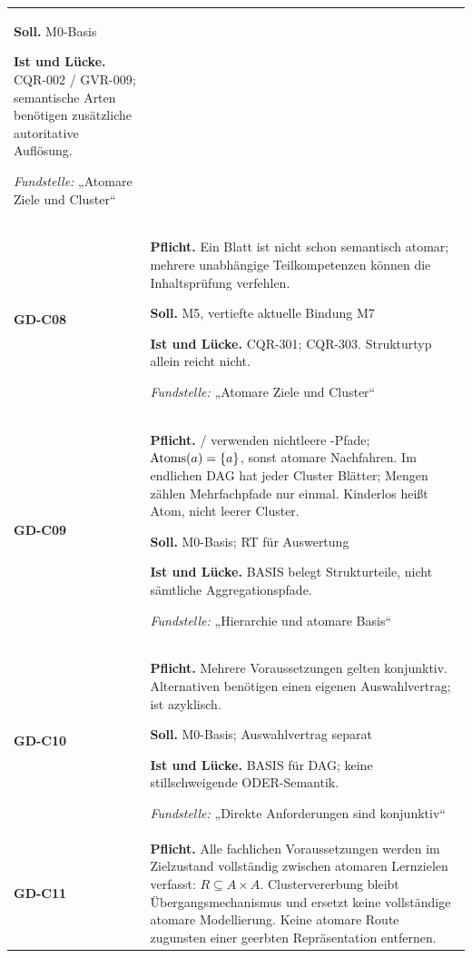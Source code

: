 \begin{longtable}{@{}P{20mm}P{128mm}@{}}
\textbf{Soll.} M0-Basis\par\smallskip
\textbf{Ist und Lücke.} CQR-002 / GVR-009; semantische Arten benötigen zusätzliche autoritative Auflösung.\par\smallskip
\emph{Fundstelle:} „Atomare Ziele und Cluster“\\\addlinespace[5pt]
\label{rule:GD-C08}\textbf{GD-C08} &
\textbf{Pflicht.} Ein Blatt ist nicht schon semantisch atomar; mehrere unabhängige Teilkompetenzen können die Inhaltsprüfung verfehlen.\par\smallskip
\textbf{Soll.} M5, vertiefte aktuelle Bindung M7\par\smallskip
\textbf{Ist und Lücke.} CQR-301; CQR-303. Strukturtyp allein reicht nicht.\par\smallskip
\emph{Fundstelle:} „Atomare Ziele und Cluster“\\\addlinespace[5pt]
\label{rule:GD-C09}\textbf{GD-C09} &
\textbf{Pflicht.} / verwenden nichtleere -Pfade; \(\operatorname{Atoms}(a)=\{a\}\), sonst atomare Nachfahren. Im endlichen DAG hat jeder Cluster Blätter; Mengen zählen Mehrfachpfade nur einmal. Kinderlos heißt Atom, nicht leerer Cluster.\par\smallskip
\textbf{Soll.} M0-Basis; RT für Auswertung\par\smallskip
\textbf{Ist und Lücke.} BASIS belegt Strukturteile, nicht sämtliche Aggregationspfade.\par\smallskip
\emph{Fundstelle:} „Hierarchie und atomare Basis“\\\addlinespace[5pt]
\label{rule:GD-C10}\textbf{GD-C10} &
\textbf{Pflicht.} Mehrere Voraussetzungen gelten konjunktiv. Alternativen benötigen einen eigenen Auswahlvertrag;  ist azyklisch.\par\smallskip
\textbf{Soll.} M0-Basis; Auswahlvertrag separat\par\smallskip
\textbf{Ist und Lücke.} BASIS für DAG; keine stillschweigende ODER-Semantik.\par\smallskip
\emph{Fundstelle:} „Direkte Anforderungen sind konjunktiv“\\\addlinespace[5pt]
\label{rule:GD-C11}\textbf{GD-C11} &
\textbf{Pflicht.} Alle fachlichen Voraussetzungen werden im Zielzustand vollständig zwischen atomaren Lernzielen verfasst: \(R\subseteq A\times A\). Clustervererbung bleibt Übergangsmechanismus und ersetzt keine vollständige atomare Modellierung. Keine atomare Route zugunsten einer geerbten Repräsentation entfernen.\par\smallskip

\end{longtable}
